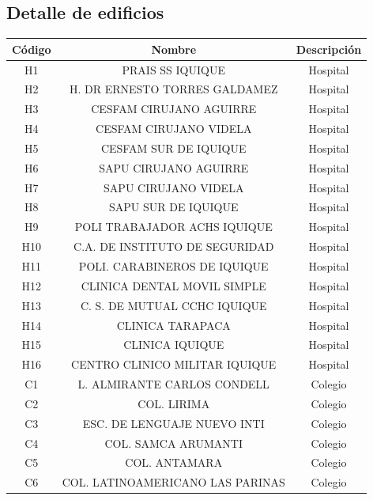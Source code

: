 \documentclass[12pt,a4paper]{article}
\begin{document}
\subsection{Detalle de edificios} \label{anexo1}

\begin{table}[htb!]
	\centering
	\begin{tabular}{|c|c|c|}
\hline 
Código & Nombre                         & Descripción \\  \hline
H1     & PRAIS SS IQUIQUE               & Hospital    \\  
H2     & H. DR ERNESTO TORRES GALDAMEZ  & Hospital    \\  
H3     & CESFAM CIRUJANO AGUIRRE        & Hospital    \\  
H4     & CESFAM CIRUJANO VIDELA         & Hospital    \\  
H5     & CESFAM SUR DE IQUIQUE          & Hospital    \\  
H6     & SAPU CIRUJANO AGUIRRE          & Hospital    \\  
H7     & SAPU CIRUJANO VIDELA           & Hospital    \\  
H8     & SAPU SUR DE IQUIQUE            & Hospital    \\  
H9     & POLI TRABAJADOR ACHS IQUIQUE   & Hospital    \\  
H10    & C.A. DE INSTITUTO DE SEGURIDAD & Hospital    \\  
H11    & POLI.  CARABINEROS DE IQUIQUE  & Hospital    \\  
H12    & CLINICA DENTAL MOVIL SIMPLE    & Hospital    \\  
H13    & C. S. DE MUTUAL CCHC IQUIQUE   & Hospital    \\  
H14    & CLINICA TARAPACA               & Hospital    \\  
H15    & CLINICA IQUIQUE                & Hospital    \\  
H16    & CENTRO CLINICO MILITAR IQUIQUE & Hospital    \\  
C1     & L. ALMIRANTE CARLOS CONDELL      & Colegio     \\  
C2     & COL. LIRIMA                      & Colegio     \\  
C3     & ESC. DE LENGUAJE NUEVO INTI      & Colegio     \\  
C4     & COL. SAMCA ARUMANTI              & Colegio     \\  
C5     & COL. ANTAMARA                    & Colegio     \\  
C6     & COL. LATINOAMERICANO LAS PARINAS & Colegio     \\  

\end{tabular}
\end{table}
\end{document}
